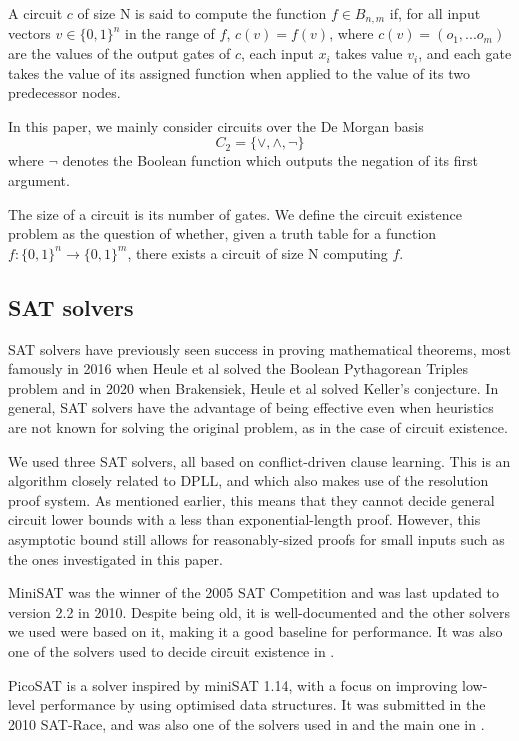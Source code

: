 \documentclass{article}
\begin{document}
A circuit \(c\) of size N is said to compute the function \(f\in B_{n,m}\) if, for all input vectors \(v\in\{0,1\}^n\) in the range of \(f\), \(c(v)=f(v)\), where \(c(v) = (o_1,...o_m)\) are the values of the output gates of \(c\), each input \(x_i\) takes value \(v_i\), and each gate takes the value of its assigned function when applied to the value of its two predecessor nodes.

In this paper, we mainly consider circuits over the De Morgan basis \[C_2 = \{\lor, \land, \neg\}\] where \(\neg\) denotes the Boolean function which outputs the negation of its first argument.

The size of a circuit is its number of gates. We define the circuit existence problem as the question of whether, given a truth table for a function \(f: \{0,1\}^n \to \{0,1\}^m\), there exists a circuit of size N computing \(f\).

\subsection{SAT solvers}

SAT solvers have previously seen success in proving mathematical theorems, most famously in 2016 when Heule et al solved the Boolean Pythagorean Triples problem\cite{heule} and in 2020 when Brakensiek, Heule et al solved Keller's conjecture\cite{heule2}. In general, SAT solvers have the advantage of being effective even when heuristics are not known for solving the original problem, as in the case of circuit existence.

We used three SAT solvers, all based on conflict-driven clause learning. This is an algorithm closely related to DPLL, and which also makes use of the resolution proof system.\cite{cdcl}\cite{krajicek} As mentioned earlier, this means that they cannot decide general circuit lower bounds with a less than exponential-length proof.\cite{raz} However, this asymptotic bound still allows for reasonably-sized proofs for small inputs such as the ones investigated in this paper.

MiniSAT\cite{minisat} was the winner of the 2005 SAT Competition and was last updated to version 2.2 in 2010\cite{minisat2010}. Despite being old, it is well-documented and the other solvers we used were based on it, making it a good baseline for performance. It was also one of the solvers used to decide circuit existence in \cite{kulikov}.

PicoSAT is a solver inspired by miniSAT 1.14, with a focus on improving low-level performance by using optimised data structures\cite{picosat}. It was submitted in the 2010 SAT-Race, and was also one of the solvers used in \cite{kulikov} and the main one in \cite{kulikovlocal}.
\end{document}
